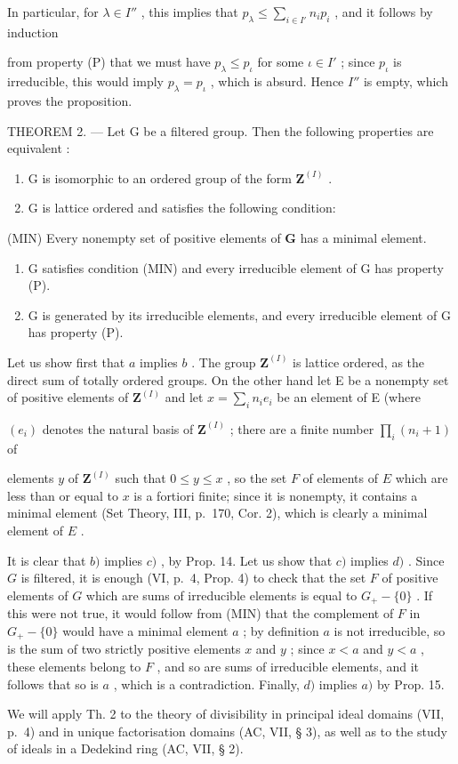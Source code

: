 In particular, for \(\lambda \in I''\) , this implies that \(p_{\lambda} \leqslant \sum_{i \in I'} n_i p_i\) , and it follows by induction

from property (P) that we must have \(p_{\lambda} \leqslant p_{\iota}\) for some \(\iota \in I'\) ; since \(p_{\iota}\) is irreducible, this would imply \(p_{\lambda} = p_{\iota}\) , which is absurd. Hence \(I''\) is empty, which proves the proposition.

THEOREM 2. --- Let G be a filtered group. Then the following properties are equivalent :

\begin{enumerate}
\def\labelenumi{\alph{enumi})}
\item
  G is isomorphic to an ordered group of the form \(\mathbf{Z}^{(I)}\) .
\item
  G is lattice ordered and satisfies the following condition:
\end{enumerate}

(MIN) Every nonempty set of positive elements of \(\mathbf{G}\) has a minimal element.

\begin{enumerate}
\def\labelenumi{\alph{enumi})}
\setcounter{enumi}{2}
\item
  G satisfies condition (MIN) and every irreducible element of G has property (P).
\item
  G is generated by its irreducible elements, and every irreducible element of G has property (P).
\end{enumerate}

Let us show first that \(a\) implies \(b\) . The group \(\mathbf{Z}^{(I)}\) is lattice ordered, as the direct sum of totally ordered groups. On the other hand let E be a nonempty set of positive elements of \(\mathbf{Z}^{(I)}\) and let \(x = \sum_{i} n_i e_i\) be an element of E (where

\((e_{i})\) denotes the natural basis of \(\mathbf{Z}^{(I)}\) ; there are a finite number \(\prod_{i}(n_{i} + 1)\) of

elements \(y\) of \(\mathbf{Z}^{(I)}\) such that \(0 \leqslant y \leqslant x\) , so the set \(F\) of elements of \(E\) which are less than or equal to \(x\) is a fortiori finite; since it is nonempty, it contains a minimal element (Set Theory, III, p.~170, Cor. 2), which is clearly a minimal element of \(E\) .

It is clear that \(b)\) implies \(c)\) , by Prop. 14. Let us show that \(c)\) implies \(d)\) . Since \(G\) is filtered, it is enough (VI, p.~4, Prop. 4) to check that the set \(F\) of positive elements of \(G\) which are sums of irreducible elements is equal to \(G_{+} - \{0\}\) . If this were not true, it would follow from (MIN) that the complement of \(F\) in \(G_{+} - \{0\}\) would have a minimal element \(a\) ; by definition \(a\) is not irreducible, so is the sum of two strictly positive elements \(x\) and \(y\) ; since \(x < a\) and \(y < a\) , these elements belong to \(F\) , and so are sums of irreducible elements, and it follows that so is \(a\) , which is a contradiction. Finally, \(d)\) implies \(a)\) by Prop. 15.

We will apply Th. 2 to the theory of divisibility in principal ideal domains (VII, p.~4) and in unique factorisation domains (AC, VII, § 3), as well as to the study of ideals in a Dedekind ring (AC, VII, § 2).

